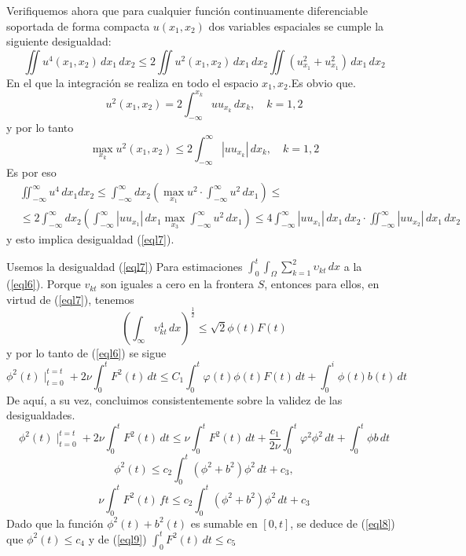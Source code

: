 Verifiquemos ahora que para cualquier función continuamente diferenciable soportada de forma compacta $u(x_1,x_2)$ dos variables espaciales se cumple la siguiente desigualdad:
\begin{equation}
    \iint u^4\left(x_1,x_2\right)\,dx_1\,dx_2\leq 2\iint u^2\left(x_1,x_2\right)\,dx_1\,dx_2\iint \left(u^{2}_{x_1} + u^{2}_{x_1} \right)\,dx_1\,dx_2
    \label{eql7}
\end{equation}
En el que la integración se realiza en todo el espacio $x_1, x_2$.Es obvio que.
\begin{equation*}
    u^2\left(x_1,x_2\right) = 2 \int_{ - \infty}^{x_k} uu_{x_k}\,dx_k,\quad k = 1,2
\end{equation*}
y por lo tanto
\begin{equation*}
    \max_{x_k}u^2 \left(x_1,x_2\right) \leq 2\int_{ - \infty}^{\infty}\left\lvert uu_{x_k}\right\rvert \,dx_k,\quad k = 1,2
\end{equation*}
Es por eso
\begin{align*}
    &\iint_{ -\infty}^{\infty}u^4\,dx_1dx_2 \leq \int_{ -\infty}^{\infty}dx_2\left(\max_{x_1}u^2\cdot\int_{ -\infty}^{\infty}u^2\,dx_1  \right)\leq  \\
    &\leq 2\int_{ -\infty }^{\infty}dx_2\left(\int_{ -\infty}^{\infty}\left\lvert uu_{x_1}\right\rvert \,dx_1 \max_{x_3}\int_{-\infty}^{\infty}u^2\,dx_1\right)\leq 4\int_{ -\infty}^{\infty}\left\lvert uu_{x_1} \right\rvert\,dx_1 \,dx_2\cdot \iint_{ -\infty}^{\infty}\left\lvert uu_{x_2}\right\rvert\,dx_1\,dx_2
\end{align*}
y esto implica desigualdad (\ref{eql7}).

Usemos la desigualdad (\ref{eql7}) Para estimaciones $\int_0^t\int_{\Omega}\sum_{k = 1}^2 \upsilon_{kt}\,dx$ a la (\ref{eql6}). Porque $v_{kt}$ son iguales a cero en la frontera $S$, entonces para ellos, en virtud de (\ref{eql7}), tenemos
\begin{equation*}
    \left(\int_{\infty} \upsilon_{kt}^4\,dx \right)^{\frac{1}{2}} \leq \sqrt{2}\phi(t)F(t)
\end{equation*}
y por lo tanto de (\ref{eql6}) se sigue
\begin{equation*}
    \phi^2(t)\mid_{t = 0}^{t = t} + 2 \nu\int_0^t F^2(t)\,dt \leq C_1\int_0^t \varphi(t) \phi(t) F(t)\,dt + \int_0^i \phi(t)b(t)\,dt
\end{equation*}
De aquí, a su vez, concluimos consistentemente sobre la validez de las desigualdades.
\begin{equation*}
    \phi^2(t)\mid_{t = 0}^{t = t} + 2 \nu\int_0^t F^2(t)\,dt \leq \nu\int_0^t F^2(t)\,dt + \frac{c_1}{2\nu}\int_0^t \varphi^2\phi^2\,dt + \int_0^t\phi b\,dt
\end{equation*}
\begin{equation}
    \phi^2(t)\leq c_2\int_0^t \left(\phi^2 + b^2\right)\phi^2\,dt + c_3,
    \label{eql8}
\end{equation}
\begin{equation}
    \nu \int_0^tF^2(t)\,ft\leq c_2\int_0^t\left(\phi^2 + b^2\right)\phi^2\,dt + c_3
    \label{eql9}
\end{equation}
Dado que la función $\phi^2(t) + b^2(t)$ es sumable en $[0, t]$, se deduce de (\ref{eql8}) que $\phi^2(t)\leq c_4$ y de (\ref{eql9}) $\int_0^t F^2(t)\,dt\leq c_5$

